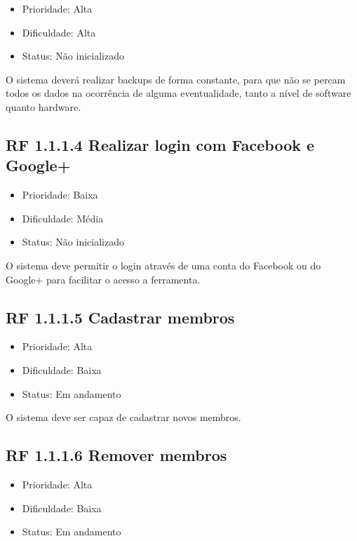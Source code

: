 \begin{apendicesenv}
\begin{itemize}
  \item{Prioridade: Alta}
  \item{Dificuldade: Alta}
  \item{Status: Não inicializado}
\end{itemize}

O sistema deverá realizar backups de forma constante, para que não se percam todos os dados na ocorrência de alguma eventualidade, tanto a nível de software quanto hardware.


\subsection{RF 1.1.1.4 Realizar login com Facebook e Google+}

\begin{itemize}
  \item{Prioridade: Baixa}
  \item{Dificuldade: Média}
  \item{Status: Não inicializado}
\end{itemize}

O sistema deve permitir o login através de uma conta do Facebook ou do Google+ para facilitar o acesso a ferramenta.


\subsection{RF 1.1.1.5 Cadastrar membros}

\begin{itemize}
  \item{Prioridade: Alta}
  \item{Dificuldade: Baixa}
  \item{Status: Em andamento}
\end{itemize}

O sistema deve ser capaz de cadastrar novos membros.


\subsection{RF 1.1.1.6 Remover membros}

\begin{itemize}
  \item{Prioridade: Alta}
  \item{Dificuldade: Baixa}
  \item{Status: Em andamento}
\end{itemize}


\end{apendicesenv}

